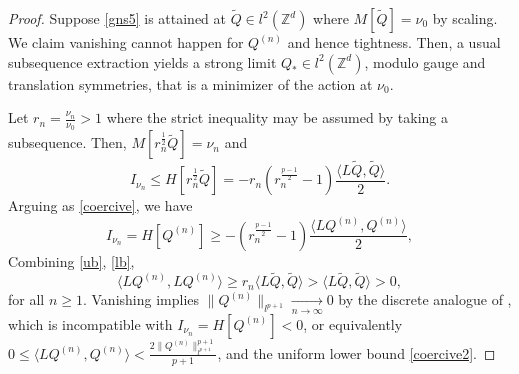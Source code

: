 \documentclass{article}
\numberwithin{equation}{section}
\begin{document}
\begin{proof}
Suppose \eqref{gns5} is attained at $\tilde{Q} \in l^2(\mathbb{Z}^d)$ where $M[\tilde{Q}] = \nu_0$ by scaling. We claim vanishing cannot happen for $Q^{(n)}$ and hence tightness. Then, a usual subsequence extraction yields a strong limit $Q_{*} \in l^2(\mathbb{Z}^d)$, modulo gauge and translation symmetries, that is a minimizer of the action at $\nu_0$.

Let $r_n = \frac{\nu_n}{\nu_0} > 1$ where the strict inequality may be assumed by taking a subsequence. Then, $M[r_n^{\frac{1}{2}}\tilde{Q}] = \nu_n$ and
\begin{equation}\label{ub}
    I_{\nu_n} \leq H[r_n^{\frac{1}{2}}\tilde{Q}] = -r_n (r_n^{\frac{p-1}{2}}-1) \frac{\langle L\tilde{Q},\tilde{Q} \rangle}{2}.
\end{equation}
Arguing as \eqref{coercive}, we have
\begin{equation}\label{lb}
    I_{\nu_n} = H[Q^{(n)}] \geq -(r_n^{\frac{p-1}{2}} - 1) \frac{\langle L Q^{(n)},Q^{(n)}\rangle}{2} ,
\end{equation}
Combining \eqref{ub}, \eqref{lb},
\begin{equation}\label{coercive2}
    \langle LQ^{(n)},LQ^{(n)}\rangle \geq r_n\langle L\tilde{Q},\tilde{Q} \rangle > \langle L\tilde{Q},\tilde{Q} \rangle > 0,
\end{equation}
for all $n \geq 1$. Vanishing implies $\| Q^{(n)}\|_{l^{p+1}} \xrightarrow[n \rightarrow \infty]{} 0$ by the discrete analogue of \cite[Lemma I.1]{Lions1984II}, which is incompatible with $I_{\nu_n} = H[Q^{(n)}] < 0$, or equivalently $0 \leq \langle L Q^{(n)}, Q^{(n)}\rangle < \frac{2 \| Q^{(n)}\|_{l^{p+1}}^{p+1}}{p+1}$, and the uniform lower bound \eqref{coercive2}.

\end{proof}
\end{document}
